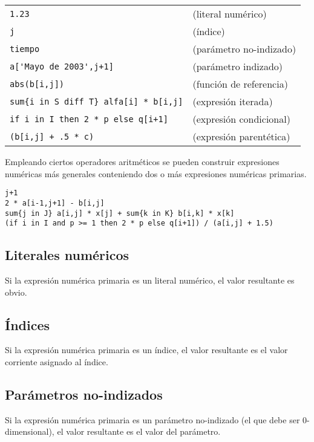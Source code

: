 \documentclass[11pt,spanish]{report}
\def\para#1{\noindent{\bf#1}}
\begin{document}
\para{Ejemplos}

\noindent
\begin{tabular}{@{}ll@{}}
\verb|1.23|&(literal numérico)\\
\verb|j|&(índice)\\
\verb|tiempo|&(parámetro no-indizado)\\
\verb|a['Mayo de 2003',j+1]|&(parámetro indizado)\\
\verb|abs(b[i,j])|&(función de referencia)\\
\verb|sum{i in S diff T} alfa[i] * b[i,j]|&(expresión iterada)\\
\verb|if i in I then 2 * p else q[i+1]|&(expresión condicional)\\
\verb|(b[i,j] + .5 * c)|&(expresión parentética)\\
\end{tabular}

Empleando ciertos operadores aritméticos se pueden construir expresiones numéricas más generales conteniendo dos o más expresiones numéricas primarias.

\para{Ejemplos}

\begin{verbatim}
j+1
2 * a[i-1,j+1] - b[i,j]
sum{j in J} a[i,j] * x[j] + sum{k in K} b[i,k] * x[k]
(if i in I and p >= 1 then 2 * p else q[i+1]) / (a[i,j] + 1.5)
\end{verbatim}

\subsection{Literales numéricos}

Si la expresión numérica primaria es un literal numérico, el valor resultante es obvio.

\subsection{Índices}

Si la expresión numérica primaria es un índice, el valor resultante es el valor corriente asignado al índice.

\subsection{Parámetros no-indizados}

Si la expresión numérica primaria es un parámetro no-indizado (el que debe ser 0-dimensional), el valor resultante es el valor del parámetro.
\end{document}
